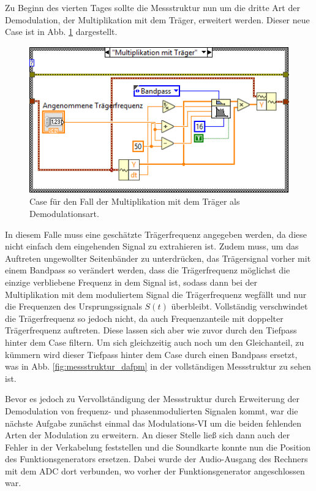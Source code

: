 
	
	\pagestyle{headings}
	Zu Beginn des vierten Tages sollte die Messstruktur nun um die dritte Art der Demodulation, der Multiplikation mit dem Träger, erweitert werden.
	Dieser neue Case ist in Abb. \ref{fig:messstruktur_dam_case3} dargestellt.
	\begin{figure}[H]
		\centering
		\includegraphics[width=\textwidth]{pic/messstruktur_dam_case3.png}
		\caption{Case für den Fall der  Multiplikation mit dem Träger als Demodulationsart.}
		\label{fig:messstruktur_dam_case3}	
	\end{figure} 
	In diesem Falle muss eine geschätzte Trägerfrequenz angegeben werden, da diese nicht einfach dem eingehenden Signal zu extrahieren ist.
	Zudem muss, um das Auftreten ungewollter Seitenbänder zu unterdrücken, das Trägersignal vorher mit einem Bandpass so verändert werden, dass die Trägerfrequenz möglichst die einzige verbliebene Frequenz in dem Signal ist, sodass dann bei der Multiplikation mit dem moduliertem Signal die Trägerfrequenz wegfällt und nur die Frequenzen des Ursprungssignals $S(t)$ überbleibt.
	Vollständig verschwindet die Trägerfrequenz so jedoch nicht, da auch Frequenzanteile mit doppelter Trägerfrequenz auftreten.
	Diese lassen sich aber wie zuvor durch den Tiefpass hinter dem Case filtern.
	Um sich gleichzeitig auch noch um den Gleichanteil, zu kümmern wird dieser Tiefpass hinter dem Case durch einen Bandpass ersetzt, was in Abb. \ref{fig:messstruktur_dafpm} in der vollständigen Messstruktur zu sehen ist.
	
	Bevor es jedoch zu Vervollständigung der Messstruktur durch Erweiterung der Demodulation von frequenz- und phasenmodulierten Signalen kommt, war die nächste Aufgabe zunächst einmal das Modulations-VI um die beiden fehlenden Arten der Modulation zu erweitern.
	An dieser Stelle ließ sich dann auch der Fehler in der Verkabelung feststellen und die Soundkarte konnte nun die Position des Funktionsgenerators ersetzen.
	Dabei wurde der Audio-Ausgang des Rechners mit dem ADC dort verbunden, wo vorher der Funktionsgenerator angeschlossen war.
	
